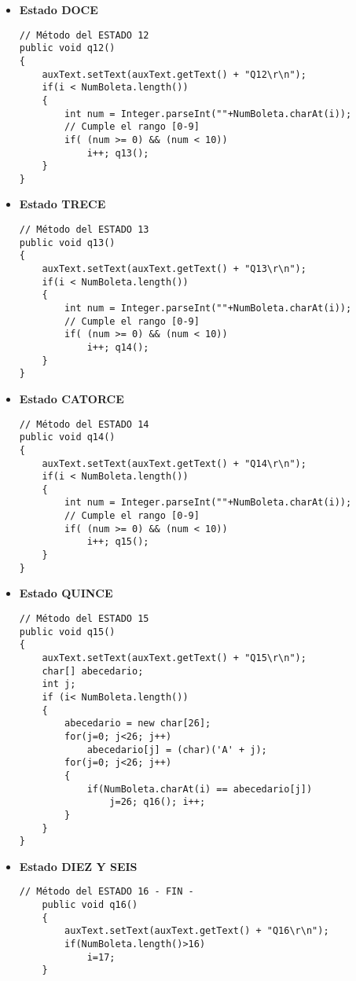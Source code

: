 \documentclass[12pt]{article}
\begin{document}
\begin{itemize}
		\item[$\overrightarrow$] \textbf{Estado DOCE}

		\begin{lstlisting}[style=Java]
// Método del ESTADO 12
public void q12()
{
	auxText.setText(auxText.getText() + "Q12\r\n");
	if(i < NumBoleta.length())
	{
		int num = Integer.parseInt(""+NumBoleta.charAt(i));
		// Cumple el rango [0-9]
		if( (num >= 0) && (num < 10))
			i++; q13();
	}	
}
		\end{lstlisting}

		\item[$\overrightarrow$] \textbf{Estado TRECE}

		\begin{lstlisting}[style=Java]
// Método del ESTADO 13
public void q13()
{
	auxText.setText(auxText.getText() + "Q13\r\n");
	if(i < NumBoleta.length())
	{
		int num = Integer.parseInt(""+NumBoleta.charAt(i));
		// Cumple el rango [0-9]
		if( (num >= 0) && (num < 10))
			i++; q14();
	}	
}

		\end{lstlisting}
	\newpage

		\item[$\overrightarrow$] \textbf{Estado CATORCE}

		\begin{lstlisting}[style=Java]
// Método del ESTADO 14
public void q14()
{
	auxText.setText(auxText.getText() + "Q14\r\n");
	if(i < NumBoleta.length())
	{
		int num = Integer.parseInt(""+NumBoleta.charAt(i));
		// Cumple el rango [0-9]
		if( (num >= 0) && (num < 10))
			i++; q15();
	}	
}
		\end{lstlisting}

		\item[$\overrightarrow$] \textbf{Estado QUINCE}

		\begin{lstlisting}[style=Java]
// Método del ESTADO 15
public void q15()
{
	auxText.setText(auxText.getText() + "Q15\r\n");
	char[] abecedario;
	int j;
	if (i< NumBoleta.length())
	{
		abecedario = new char[26];
		for(j=0; j<26; j++)
			abecedario[j] = (char)('A' + j);
		for(j=0; j<26; j++)
		{
			if(NumBoleta.charAt(i) == abecedario[j])
				j=26; q16(); i++;	
		}
	}
}
		\end{lstlisting}

		\item[$\overrightarrow$] \textbf{Estado DIEZ Y SEIS}

		\begin{lstlisting}[style=Java]
	// Método del ESTADO 16 - FIN -
	public void q16()
	{
		auxText.setText(auxText.getText() + "Q16\r\n");
		if(NumBoleta.length()>16)
			i=17;
	}
		\end{lstlisting}

	\end{itemize}
\end{document}
